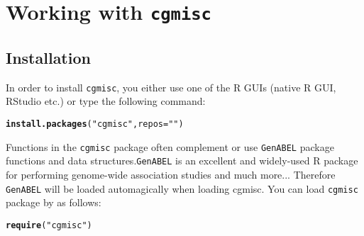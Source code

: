 \documentclass[12pt,a4paper,oneside]{article}\usepackage[]{graphicx}\usepackage[]{color}
\makeatletter
\newcommand{\hlstr}[1]{\textcolor[rgb]{0.192,0.494,0.8}{#1}}%
\newcommand{\hlstd}[1]{\textcolor[rgb]{0.345,0.345,0.345}{#1}}%
\newcommand{\hlkwc}[1]{\textcolor[rgb]{0.333,0.667,0.333}{#1}}%
\newcommand{\hlkwd}[1]{\textcolor[rgb]{0.737,0.353,0.396}{\textbf{#1}}}%
\newenvironment{kframe}{%
 \def\at@end@of@kframe{}%
 \ifinner\ifhmode%
  \def\at@end@of@kframe{\end{minipage}}%
  \begin{minipage}{\columnwidth}%
 \fi\fi%
 \def\FrameCommand##1{\hskip\@totalleftmargin \hskip-\fboxsep
 \colorbox{shadecolor}{##1}\hskip-\fboxsep
     \hskip-\linewidth \hskip-\@totalleftmargin \hskip\columnwidth}%
 \MakeFramed {\advance\hsize-\width
   \@totalleftmargin\z@ \linewidth\hsize
   \@setminipage}}%
 {\par\unskip\endMakeFramed%
 \at@end@of@kframe}
\newenvironment{knitrout}{}{} %
\makeatother
\begin{document}
\section*{Working with \texttt{cgmisc}}
\subsection{Installation}
\noindent In order to install \texttt{cgmisc}, you either use one of the R GUIs (native R GUI, RStudio etc.) or type the following command:

\begin{knitrout}\footnotesize
{}\color{fgcolor}\begin{kframe}
\begin{alltt}
 \hlkwd{install.packages}\hlstd{(}\hlstr{"cgmisc"}\hlstd{,} \hlkwc{repos}\hlstd{=}\hlstr{""}\hlstd{)}
\end{alltt}
\end{kframe}
\end{knitrout}

\noindent Functions in the \texttt{cgmisc} package often complement or use \texttt{GenABEL} package functions and data structures.\texttt{GenABEL} is an excellent and widely-used R package for performing genome-wide association studies and much more... Therefore \texttt{GenABEL} will be loaded automagically when loading cgmisc. You can load \texttt{cgmisc} package by as follows:

\begin{knitrout}\footnotesize
{}\color{fgcolor}\begin{kframe}
\begin{alltt}
\hlkwd{require}\hlstd{(}\hlstr{"cgmisc"}\hlstd{)}
\end{alltt}


{\ttfamily\noindent\itshape\color{messagecolor}{\#\# Loading required package: cgmisc\\\#\# Loading required package: GenABEL\\\#\# Loading required package: MASS\\\#\# Loading required package: GenABEL.data\\\#\# \\\#\#\ \ Package cgmisc contains miscellaneous functions, useful for extending\\\#\# genome-wide association study (GWAS) analyses. \\\#\# \\\#\# Package Name: cgmisc \\\#\#\ \ Version: 2.9.3 \\\#\#\ \ Date: 2014-08-13 \\\#\#\ \ Author: Marcin Kierczak <marcin.kierczak@imbim.uu.se> \\\#\#\ \ License GPL (>=2.10) \\\#\# \\\#\#\ \ Package contains various functions useful in computational\\\#\#\ \ \ \  genetics, especially in genome-wide association studies.}}\end{kframe}
\end{knitrout}
\end{document}
